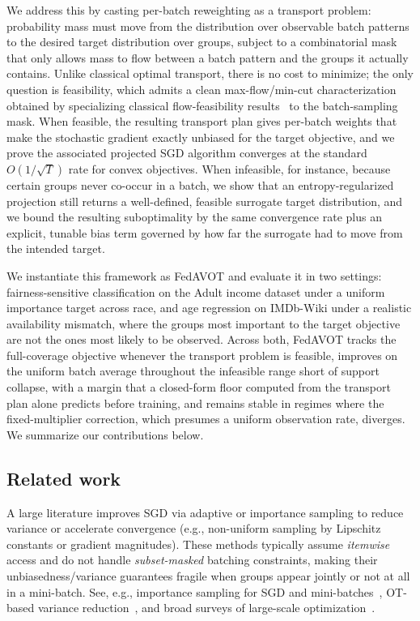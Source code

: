\documentclass[9pt]{extarticle}
\theoremstyle{definition}
\renewcommand{\paragraph}[1]{\par\medskip\noindent{\bf #1}\hspace{0.5em}\ignorespaces}
\begin{document}
We address this by casting per-batch reweighting as a transport problem: probability mass must move from the distribution over observable batch patterns to the desired target distribution over groups, subject to a combinatorial mask that only allows mass to flow between a batch pattern and the groups it actually contains. Unlike classical optimal transport, there is no cost to minimize; the only question is feasibility, which admits a clean max-flow/min-cut characterization obtained by specializing classical flow-feasibility results~\cite{fordfulkerson1962flows,hall1935representatives} to the batch-sampling mask. When feasible, the resulting transport plan gives per-batch weights that make the stochastic gradient exactly unbiased for the target objective, and we prove the associated projected SGD algorithm converges at the standard $O(1/\sqrt{T})$ rate for convex objectives. When infeasible, for instance, because certain groups never co-occur in a batch, we show that an entropy-regularized projection still returns a well-defined, feasible surrogate target distribution, and we bound the resulting suboptimality by the same convergence rate plus an explicit, tunable bias term governed by how far the surrogate had to move from the intended target.

We instantiate this framework as FedAVOT and evaluate it in two settings: fairness-sensitive classification on the Adult income dataset under a uniform importance target across race, and age regression on IMDb-Wiki under a realistic availability mismatch, where the groups most important to the target objective are not the ones most likely to be observed. Across both, FedAVOT tracks the full-coverage objective whenever the transport problem is feasible, improves on the uniform batch average throughout the infeasible range short of support collapse, with a margin that a closed-form floor computed from the transport plan alone predicts before training, and remains stable in regimes where the fixed-multiplier correction, which presumes a uniform observation rate, diverges. We summarize our contributions below.

\subsection*{Related work}
\paragraph{SGD, importance sampling, and variance reduction.}
A large literature improves SGD via adaptive or importance sampling to reduce variance or accelerate convergence (e.g., non-uniform sampling by Lipschitz constants or gradient magnitudes). These methods typically assume \emph{itemwise} access and do not handle \emph{subset-masked} batching constraints, making their unbiasedness/variance guarantees fragile when groups appear jointly or not at all in a mini-batch. See, e.g., importance sampling for SGD and mini-batches~\cite{needell2016sgd,alain2015variance,csiba2018minibatch}, OT-based variance reduction~\cite{blanchet2023optimal}, and broad surveys of large-scale optimization~\cite{bottou2018optimization}.
\end{document}
